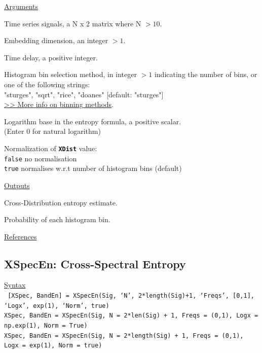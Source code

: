 \documentclass[12pt, a4paper, titlepage, openany]{book}
\begin{document}
\noindent \ul{Arguments}
\begin{description}[labelsep=1cm, labelwidth=2cm, nosep, style=multiline,leftmargin=3cm]\footnotesize
\item[\texttt{Sig}]		Time series signals, a N x 2 matrix where N $> 10$.
\item[\texttt{m}]		Embedding dimension, an integer $> 1$.
\item[\texttt{tau}]		Time delay, a positive integer.
\item[\texttt{Bins}]	Histogram bin selection method, in integer $> 1$ indicating the number of bins, 
						or one of the following strings:\\
   					    "sturges", "sqrt", "rice", "doanes" \hspace{2em} [default: "sturges"]
\\ \href{https://en.wikipedia.org/wiki/Histogram#Number_of_bins_and_width}{>> More info on binning methods}.
\item[\texttt{Logx}]	Logarithm base in the entropy formula, a positive scalar.\\
						(Enter 0 for natural logarithm)
\item[\texttt{Norm}]	Normalization of \texttt{\textbf{XDist}} value:\\
		  \texttt{false} \hspace{10pt} no normalisation \\
		  \texttt{true} \hspace{15pt} normalises w.r.t number of histogram bins (default)
\end{description}

\noindent \ul{Outputs}
\begin{description}[labelsep=1cm, labelwidth=2cm, nosep, style=multiline,leftmargin=3cm]\footnotesize
\item[\texttt{XDist}]		Cross-Distribution entropy estimate.
\item[\texttt{Ppi}]		Probability of each histogram bin.
\end{description}

\noindent \ul{References}\hspace{1cm}
\cite{Dist1}



\newpage
\subsection{\normalsize XSpecEn: \hspace{15mm} Cross-Spectral Entropy}
\noindent\ul{Syntax} \vspace{6mm} \\ \noindent \texttt{\footnotesize
[XSpec, BandEn] = XSpecEn(Sig, ‘N’, 2*length(Sig)+1, ‘Freqs’, [0,1], ‘Logx’, exp(1), ‘Norm’, true)\\
XSpec, BandEn  = XSpecEn(Sig, N = 2*len(Sig) + 1, Freqs = (0,1), Logx = np.exp(1), Norm = True)\\ 
XSpec, BandEn  = XSpecEn(Sig, N = 2*length(Sig) + 1, Freqs = (0,1), Logx = exp(1), Norm = true)}
\end{document}
